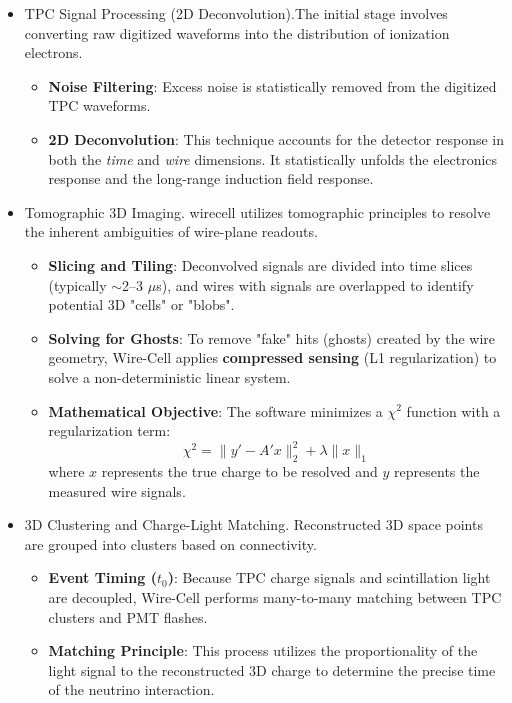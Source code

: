 \begin{itemize}
    \item TPC Signal Processing (2D Deconvolution).The initial stage involves converting raw digitized waveforms into the distribution of ionization electrons. 
    \begin{itemize}
        \item \textbf{Noise Filtering}: Excess noise is statistically removed from the digitized TPC waveforms.
        \item \textbf{2D Deconvolution}: This technique accounts for the detector response in both the \textit{time} and \textit{wire} dimensions. It statistically unfolds the electronics response and the long-range induction field response.
    \end{itemize}

    \item Tomographic 3D Imaging. \gls{wirecell} utilizes tomographic principles to resolve the inherent ambiguities of wire-plane readouts.
    \begin{itemize}
        \item \textbf{Slicing and Tiling}: Deconvolved signals are divided into time slices (typically $\sim$2--3 $\mu$s), and wires with signals are overlapped to identify potential 3D "cells" or "blobs".
        \item \textbf{Solving for Ghosts}: To remove "fake" hits (ghosts) created by the wire geometry, Wire-Cell applies \textbf{compressed sensing} (L1 regularization) to solve a non-deterministic linear system. 
        \item \textbf{Mathematical Objective}: The software minimizes a $\chi^2$ function with a regularization term:
        \begin{equation}
            \chi^2 = \|y' - A'x\|_2^2 + \lambda\|x\|_1
        \end{equation}
        where $x$ represents the true charge to be resolved and $y$ represents the measured wire signals.
    \end{itemize}

    \item 3D Clustering and Charge-Light Matching. Reconstructed 3D space points are grouped into clusters based on connectivity. 
    \begin{itemize}
        \item \textbf{Event Timing ($t_0$)}: Because TPC charge signals and scintillation light are decoupled, Wire-Cell performs many-to-many matching between TPC clusters and PMT flashes.
        \item \textbf{Matching Principle}: This process utilizes the proportionality of the light signal to the reconstructed 3D charge to determine the precise time of the neutrino interaction.
    \end{itemize}


\end{itemize}
